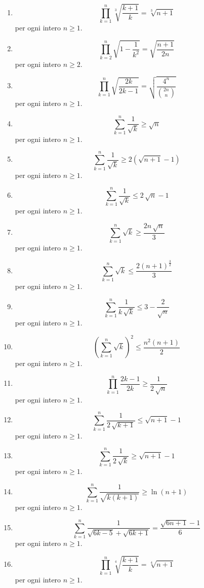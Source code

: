 \documentclass[11pt,a4paper]{article}
\begin{document}
\begin{enumerate}
{\small per ogni intero $n\ge 1$.}
\item \[ \prod_{k=1}^{n} \sqrt[3]{\frac{k + 1}{k}} = \sqrt[3]{n + 1} \]
{\small per ogni intero $n\ge 1$.}
\item \[ \prod_{k=2}^{n} \sqrt{1 - \frac{1}{k^{2}}} = \sqrt{\frac{n + 1}{2n}} \]
{\small per ogni intero $n\ge 2$.}
\item \[ \prod_{k=1}^{n} \sqrt{\frac{2k}{2k - 1}} = \sqrt{\frac{4^{n}}{\binom{2n}{n}}} \]
{\small per ogni intero $n\ge 1$.}
\item \[ \sum_{k=1}^{n} \frac{1}{\sqrt{k}} \ge \sqrt{n} \]
{\small per ogni intero $n\ge 1$.}
\item \[ \sum_{k=1}^{n} \frac{1}{\sqrt{k}} \ge 2\left(\sqrt{n + 1} - 1\right) \]
{\small per ogni intero $n\ge 1$.}
\item \[ \sum_{k=1}^{n} \frac{1}{\sqrt{k}} \le 2\,\sqrt{n} - 1 \]
{\small per ogni intero $n\ge 1$.}
\item \[ \sum_{k=1}^{n} \sqrt{k} \ge \frac{2n\,\sqrt{n}}{3} \]
{\small per ogni intero $n\ge 1$.}
\item \[ \sum_{k=1}^{n} \sqrt{k} \le \frac{2\left(n + 1\right)^{\frac{3}{2}}}{3} \]
{\small per ogni intero $n\ge 1$.}
\item \[ \sum_{k=1}^{n} \frac{1}{k\,\sqrt{k}} \le 3 - \frac{2}{\sqrt{n}} \]
{\small per ogni intero $n\ge 1$.}
\item \[ \left(\sum_{k=1}^{n} \sqrt{k}\right)^{2} \le \frac{n^{2}\left(n + 1\right)}{2} \]
{\small per ogni intero $n\ge 1$.}
\item \[ \prod_{k=1}^{n} \frac{2k - 1}{2k} \ge \frac{1}{2\,\sqrt{n}} \]
{\small per ogni intero $n\ge 1$.}
\item \[ \sum_{k=1}^{n} \frac{1}{2\,\sqrt{k + 1}} \le \sqrt{n + 1} - 1 \]
{\small per ogni intero $n\ge 1$.}
\item \[ \sum_{k=1}^{n} \frac{1}{2\,\sqrt{k}} \ge \sqrt{n + 1} - 1 \]
{\small per ogni intero $n\ge 1$.}
\item \[ \sum_{k=1}^{n} \frac{1}{\sqrt{k\left(k + 1\right)}} \ge \ln\left(n + 1\right) \]
{\small per ogni intero $n\ge 1$.}
\item \[ \sum_{k=1}^{n} \frac{1}{\sqrt{6k - 5} + \sqrt{6k + 1}} = \frac{\sqrt{6n + 1} - 1}{6} \]
{\small per ogni intero $n\ge 1$.}
\item \[ \prod_{k=1}^{n} \sqrt[4]{\frac{k + 1}{k}} = \sqrt[4]{n + 1} \]
{\small per ogni intero $n\ge 1$.}
\end{enumerate}
\end{document}
